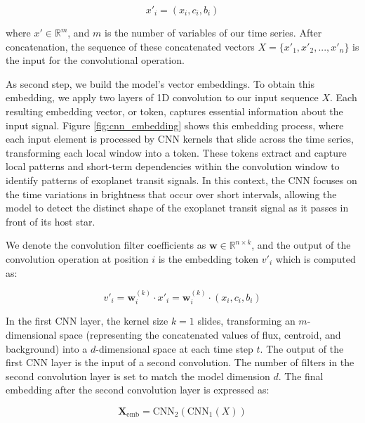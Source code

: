 \vspace{-2.5mm}
\begin{equation}
x'_i = (x_i, c_i, b_i)
\end{equation}

where $x' \in \mathbb{R}^m$, and $m$ is the number of variables of our time series. After concatenation, the sequence of these concatenated vectors $ X = \{x'_1,x'_2, ..., x'_n\}$ is the input for the convolutional operation.

As second step, we build the model's vector embeddings. To obtain this embedding, we apply two layers of 1D convolution to our input sequence $X$. Each resulting embedding vector, or token, captures essential information about the input signal. Figure \ref{fig:cnn_embedding} shows this embedding process, where each input element is processed by CNN kernels that slide across the time series, transforming each local window into a token. These tokens extract and capture local patterns and short-term dependencies within the convolution window to identify patterns of exoplanet transit signals. In this context, the CNN focuses on the time variations in brightness that occur over short intervals, allowing the model to detect the distinct shape of the exoplanet transit signal as it passes in front of its host star. \par

We denote the convolution filter coefficients as $\mathbf{w} \in \mathbb{R}^{n \times k}$, and the output of the convolution operation at position $i$ is the embedding token $v'_i$ which is computed as:

\begin{equation}
v'_i = \mathbf{w}^{\left ( k \right )}_i \cdot x'_{i} = \mathbf{w}^{\left ( k \right )}_i \cdot (x_i, c_i, b_i)
\label{eq:conv_embb}
\end{equation}

In the first CNN layer, the kernel size $k=1$ slides, transforming an $m$-dimensional space (representing the concatenated values of flux, centroid, and background) into a $d$-dimensional space at each time step $t$. The output of the first CNN layer is the input of a second convolution. The number of filters in the second convolution layer is set to match the model dimension $d$. The final embedding after the second convolution layer is expressed as: \par

\begin{equation}
\mathbf{X}_{\text{emb}} = \text{CNN}_2\left( \text{CNN}_1\left( X \right) \right)
\end{equation}

